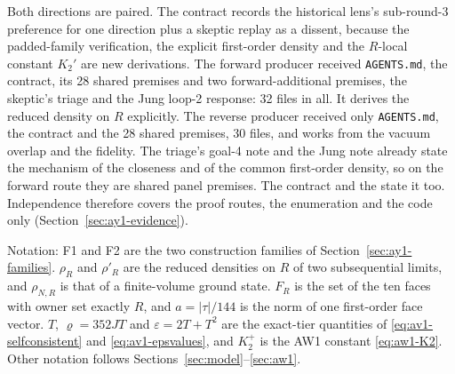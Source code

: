 Both directions are paired. The contract records the historical lens's
sub-round-3 preference for one direction plus a skeptic replay as a dissent,
because the padded-family verification, the explicit first-order density and
the $R$-local constant $K_2'$ are new derivations. The forward producer
received \texttt{AGENTS.md}, the contract, its 28 shared premises and two
forward-additional premises, the skeptic's triage and the Jung loop-2
response: 32 files in all. It derives the reduced density on $R$ explicitly.
The reverse producer received only \texttt{AGENTS.md}, the contract and the 28
shared premises, 30 files, and works from the vacuum overlap and the
fidelity. The triage's goal-4 note and the Jung note already state the
mechanism of the closeness and of the common first-order density, so on the
forward route they are shared panel premises. The contract and the
 state it too.
Independence therefore covers the proof routes, the enumeration and the code
only (Section~\ref{sec:ay1-evidence}).

Notation: F1 and F2 are the two construction families of
Section~\ref{sec:ay1-families}. $\rho_R$ and $\rho'_R$ are the reduced
densities on $R$ of two subsequential limits, and $\rho_{N,R}$ is that of a
finite-volume ground state. $F_R$ is the set of the ten faces with owner set
exactly $R$, and $a=|\tau|/144$ is the norm of one first-order face vector.
$T$, $\varrho=352JT$ and $\varepsilon=2T+T^2$ are the exact-tier quantities of
\eqref{eq:av1-selfconsistent} and \eqref{eq:av1-epsvalues}, and $K_2^+$ is the
AW1 constant \eqref{eq:aw1-K2}. Other notation follows
Sections~\ref{sec:model}--\ref{sec:aw1}.


